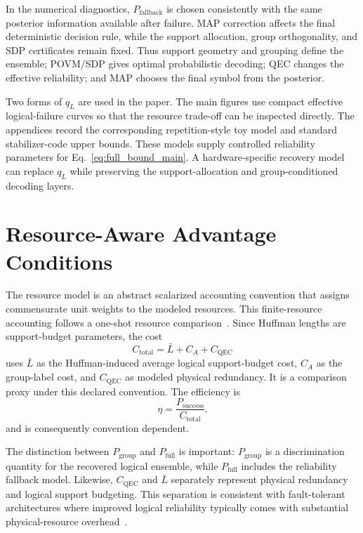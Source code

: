 \documentclass[
 reprint,
 amsmath,amssymb,
 aps,
 pra,
 floatfix,
]{revtex4-2}
\begin{document}
In the numerical diagnostics, $P_{\mathrm{fallback}}$ is chosen consistently with the same posterior information available after failure. MAP correction affects the final deterministic decision rule, while the support allocation, group orthogonality, and SDP certificates remain fixed. Thus support geometry and grouping define the ensemble; POVM/SDP gives optimal probabilistic decoding; QEC changes the effective reliability; and MAP chooses the final symbol from the posterior.

Two forms of \(q_L\) are used in the paper. The main figures use compact effective logical-failure curves so that the resource trade-off can be inspected directly. The appendices record the corresponding repetition-style toy model and standard stabilizer-code upper bounds. These models supply controlled reliability parameters for Eq.~\eqref{eq:full_bound_main}. A hardware-specific recovery model can replace \(q_L\) while preserving the support-allocation and group-conditioned decoding layers.

\section{Resource-Aware Advantage Conditions}
\label{sec:resource_advantage}

The resource model is an abstract scalarized accounting convention that assigns commensurate unit weights to the modeled resources. This finite-resource accounting follows a one-shot resource comparison~\cite{tomamichel2013hierarchy,tomamichel2016finite}. Since Huffman lengths are support-budget parameters, the cost
\begin{equation}
    C_{\mathrm{total}}=\bar L+C_A+C_{\mathrm{QEC}}
    \label{eq:total_resource}
\end{equation}
uses $\bar L$ as the Huffman-induced average logical support-budget cost, $C_A$ as the group-label cost, and $C_{\mathrm{QEC}}$ as modeled physical redundancy. It is a comparison proxy under this declared convention. The efficiency is
\begin{equation}
    \eta=\frac{P_{\mathrm{success}}}{C_{\mathrm{total}}}.
    \label{eq:eta_main}
\end{equation}
and is consequently convention dependent.

The distinction between \(P_{\mathrm{group}}\) and \(P_{\mathrm{full}}\) is important: \(P_{\mathrm{group}}\) is a discrimination quantity for the recovered logical ensemble, while \(P_{\mathrm{full}}\) includes the reliability fallback model. Likewise, \(C_{\mathrm{QEC}}\) and \(\bar L\) separately represent physical redundancy and logical support budgeting. This separation is consistent with fault-tolerant architectures where improved logical reliability typically comes with substantial physical-resource overhead~\cite{fowler2012surface,campbell2017roads}.
\end{document}
